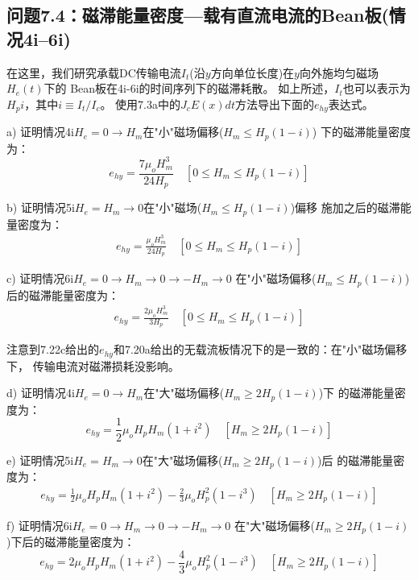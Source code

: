 \subsection{问题7.4：磁滞能量密度---载有直流电流的Bean板(情况4i--6i)}
在这里，我们研究承载DC传输电流$I_t$(沿$y$方向单位长度)在$y$向外施均匀磁场$H_e(t)$下的
Bean板在4i-6i的时间序列下的磁滞耗散。
如上所述，$I_t$也可以表示为$H_pi$，其中$i\equiv I_t/ I_c$。
使用7.3a中的$J_c E(x)dt$方法导出下面的$e_{hy}$表达式。

a) 证明情况4i$H_e=0\rightarrow H_m$在"小"磁场偏移($H_m\le H_p(1-i)$)
下的磁滞能量密度为：
\begin{equation}%
e_{hy}=\frac{7\mu_oH_{m}^{3}}{24H_p} \quad  [0\leq H_m\leq H_p(1-i)]
\end{equation}

b) 证明情况5i$H_e=H_m\rightarrow 0$在"小"磁场($H_m\le H_p(1-i)$)偏移
施加之后的磁滞能量密度为：
\begin{align*}%
e_{hy}=\frac{\mu_oH_{m}^{3}}{24H_p} \quad   [0\leq H_m\leq H_p(1-i)] \tag{7.22b}
\end{align*}

c) 证明情况6i$H_e=0\rightarrow H_m\rightarrow 0\rightarrow -H_m\rightarrow 0$
在"小"磁场偏移($H_m\le H_p(1-i)$)后的磁滞能量密度为：
\begin{align*}%
e_{hy}=\frac{2\mu_oH_{m}^{3}}{3H_p} \quad  [0\leq H_m\leq H_p(1-i)] \tag{7.22c}
\end{align*}

注意到7.22c给出的$e_{hy}$和7.20a给出的无载流板情况下的是一致的：在"小"磁场偏移下，
传输电流对磁滞损耗没影响。

d) 证明情况4i$H_e=0\rightarrow H_m$在"大"磁场偏移($H_m\ge 2H_p(1-i)$)下
的磁滞能量密度为：
\begin{equation}%
e_{hy}=\frac{1}{2}\mu_oH_pH_m(1+i^2) \quad [H_m\geq2H_p(1-i)]
\end{equation}

e) 证明情况5i$H_e=H_m\rightarrow 0$在"大"磁场偏移($H_m\ge 2H_p(1-i)$)后
的磁滞能量密度为：
\begin{align*}%
e_{hy}=\frac{1}{2}\mu_oH_pH_m(1+i^2)-\frac{2}{3}\mu_oH_{p}^{2}(1-i^3) \quad [H_m\geq2H_p(1-i)]\tag{7.23b}
\end{align*}

f) 证明情况6i$H_e=0\rightarrow H_m\rightarrow 0\rightarrow -H_m\rightarrow 0$
在"大"磁场偏移($H_m\ge 2H_p(1-i)$)下后的磁滞能量密度为：
\begin{equation}%
e_{hy}=2\mu_oH_pH_m(1+i^2)-\frac{4}{3}\mu_oH_{p}^{2}(1-i^3)\quad  [H_m\geq2H_p(1-i)] \tag{7.23c}
\end{equation}

